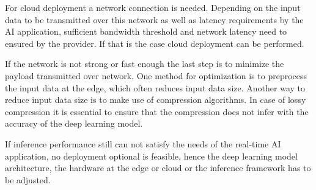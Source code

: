 For cloud deployment a network connection is needed. Depending on the input data to be transmitted over this network as well as latency requirements by the AI application, sufficient bandwidth threshold and network latency need to ensured by the provider. 
If that is the case cloud deployment can be performed.

If the network is not strong or fast enough the last step is to minimize the payload transmitted over network.
One method for optimization is to preprocess the input data at the edge, which often reduces input data size. 
Another way to reduce input data size is to make use of compression algorithms.
In case of lossy compression it is essential to ensure that the compression does not infer with the accuracy of the deep learning model.

If inference performance still can not satisfy the needs of the real-time AI application, no deployment optional is feasible, hence the deep learning model architecture, the hardware at the edge or cloud or the inference framework has to be adjusted.





